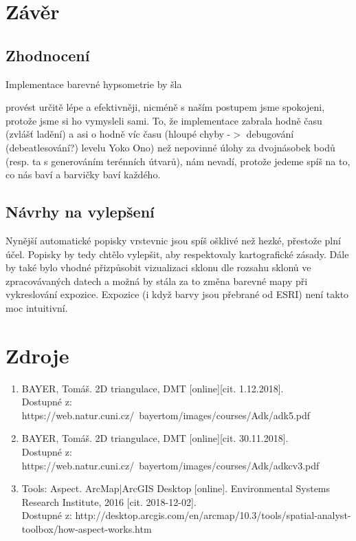 \documentclass[a4paper, 12pt]{article}
\begin{document}
\section{Závěr}

\subsection{Zhodnocení}
Implementace barevné hypsometrie by šla\begin{flushright}
	\begin{flushright}
		
	\end{flushright}
\end{flushright} provést určitě lépe a efektivněji, nicméně s naším postupem jsme spokojeni, protože jsme si ho vymysleli sami. To, že implementace zabrala hodně času (zvlášť ladění) a asi o hodně víc času (hloupé chyby -$>$ debugování (debeatlesování?) levelu Yoko Ono) než nepovinné úlohy za dvojnásobek bodů (resp. ta s generováním terénních útvarů), nám nevadí, protože jedeme spíš na to, co nás baví a barvičky baví každého.
\subsection{Návrhy na vylepšení}
Nynější automatické popisky vrstevnic jsou spíš ošklivé než hezké, přestože plní účel. Popisky by tedy chtělo vylepšit, aby respektovaly kartografické zásady. Dále by také bylo vhodné přizpůsobit vizualizaci sklonu dle rozsahu sklonů ve zpracovávaných datech a možná by stála za to změna barevné mapy při vykreslování expozice. Expozice (i když barvy jsou přebrané od ESRI) není takto moc intuitivní. 

\clearpage
\section{Zdroje}

\begin{enumerate}
\item  BAYER, Tomáš. 2D triangulace, DMT [online][cit. 1.12.2018]. \\
Dostupné z: https://web.natur.cuni.cz/~bayertom/images/courses/Adk/adk5.pdf  \\

\item  BAYER, Tomáš. 2D triangulace, DMT [online][cit. 30.11.2018]. \\
Dostupné z: https://web.natur.cuni.cz/~bayertom/images/courses/Adk/adkcv3.pdf\\

\item Tools: Aspect. ArcMap|ArcGIS Desktop [online]. Environmental Systems Research Institute, 2016 [cit. 2018-12-02]. \\
Dostupné z: http://desktop.arcgis.com/en/arcmap/10.3/tools/spatial-analyst-toolbox/how-aspect-works.htm\\
\end{enumerate}
\end{document}
